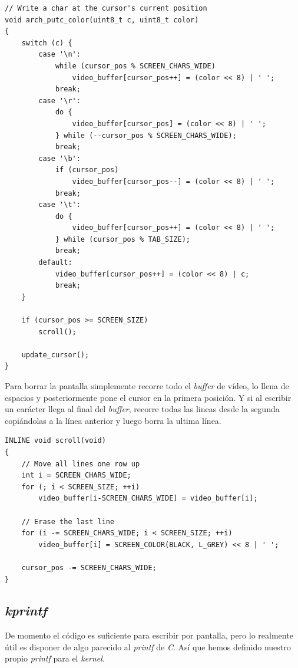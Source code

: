 \documentclass{report}
\begin{document}
\begin{lstlisting}[title=Función que escribe un carácter en pantalla]
// Write a char at the cursor's current position
void arch_putc_color(uint8_t c, uint8_t color)
{
    switch (c) {
        case '\n':
            while (cursor_pos % SCREEN_CHARS_WIDE)
                video_buffer[cursor_pos++] = (color << 8) | ' ';
            break;
        case '\r':
            do {
                video_buffer[cursor_pos] = (color << 8) | ' ';
            } while (--cursor_pos % SCREEN_CHARS_WIDE);
            break;
        case '\b':
            if (cursor_pos)
                video_buffer[cursor_pos--] = (color << 8) | ' ';
            break;
        case '\t':
            do {
                video_buffer[cursor_pos++] = (color << 8) | ' ';
            } while (cursor_pos % TAB_SIZE);
            break;
        default:
            video_buffer[cursor_pos++] = (color << 8) | c;
            break;
    }

    if (cursor_pos >= SCREEN_SIZE)
        scroll();

    update_cursor();
}
\end{lstlisting}

Para borrar la pantalla simplemente recorre todo el \textit{buffer} de vídeo, lo llena de espacios y posteriormente pone el cursor en la primera posición.
Y si al escribir un carácter llega al final del \textit{buffer}, recorre todas las lineas desde la segunda copiándolas a la línea anterior y luego borra la ultima línea.

\begin{lstlisting}[title=Función que hace \textit{scroll}]
INLINE void scroll(void)
{
    // Move all lines one row up
    int i = SCREEN_CHARS_WIDE;
    for (; i < SCREEN_SIZE; ++i)
        video_buffer[i-SCREEN_CHARS_WIDE] = video_buffer[i];

    // Erase the last line
    for (i -= SCREEN_CHARS_WIDE; i < SCREEN_SIZE; ++i)
        video_buffer[i] = SCREEN_COLOR(BLACK, L_GREY) << 8 | ' ';

    cursor_pos -= SCREEN_CHARS_WIDE;
}
\end{lstlisting}

\subsection{\textit{kprintf}}

De momento el código es suficiente para escribir por pantalla, pero lo realmente útil es disponer de algo parecido al \textit{printf} de \textit{C}.
Así que hemos definido nuestro propio \textit{printf} para el \textit{kernel}.
\end{document}
